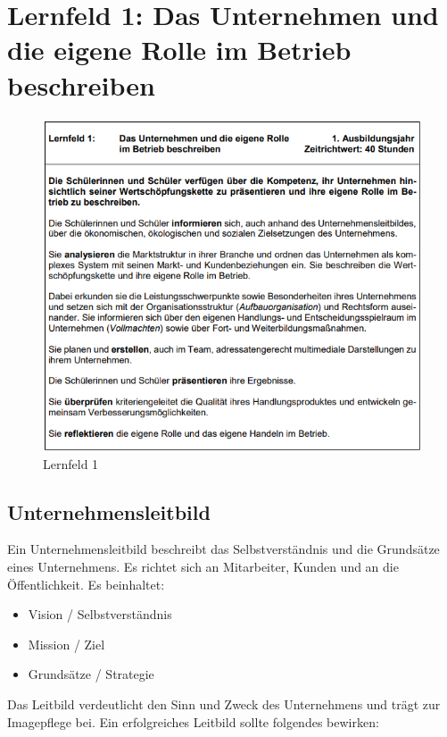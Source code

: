 \section{Lernfeld 1: Das Unternehmen und die eigene Rolle im Betrieb beschreiben}

\begin{figure}[H]
    \centering
    \includegraphics[width=\textwidth]{figures/lernfeld1.png}
    \caption{Lernfeld 1}
    \label{fig:lernfeld1}
\end{figure}
\FloatBarrier

\subsection{Unternehmensleitbild}
Ein Unternehmensleitbild beschreibt das Selbstverständnis und die Grundsätze eines Unternehmens. Es richtet sich an Mitarbeiter, Kunden und an die Öffentlichkeit. Es beinhaltet:

\begin{itemize}
    \item Vision / Selbstverständnis
    \item Mission / Ziel
    \item Grundsätze / Strategie
\end{itemize}

Das Leitbild verdeutlicht den Sinn und Zweck des Unternehmens und trägt zur Imagepflege bei. Ein erfolgreiches Leitbild sollte folgendes bewirken:

